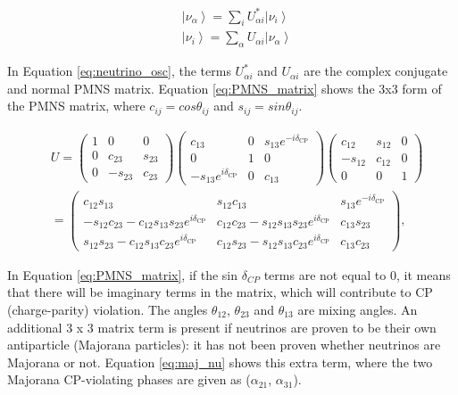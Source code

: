 $$
\begin{aligned}
&\left|\nu_{\alpha}\right\rangle=\sum_{i} U_{\alpha i}^{*}\left|\nu_{i}\right\rangle \\
&\left|\nu_{i}\right\rangle=\sum_{\alpha} U_{\alpha i}\left|\nu_{\alpha}\right\rangle
\end{aligned}
\label{eq:neutrino_osc}
$$


In Equation \ref{eq:neutrino_osc}, the terms $U_{\alpha i}^{*}$ and $U_{\alpha i}$ are the complex conjugate and normal PMNS matrix. Equation \ref{eq:PMNS_matrix} shows the 3x3 form of the PMNS matrix, where $c_{ij} = cos {\theta_{ij}}$ and $s_{ij} = sin {\theta_{ij}}$.

$$
\begin{aligned}
&U=\left(\begin{array}{ccc}
1 & 0 & 0 \\
0 & c_{23} & s_{23} \\
0 & -s_{23} & c_{23}
\end{array}\right)\left(\begin{array}{ccc}
c_{13} & 0 & s_{13} e^{-i \delta_{\mathrm{CP}}} \\
0 & 1 & 0 \\
-s_{13} e^{i \delta_{\mathrm{CP}}} & 0 & c_{13}
\end{array}\right)\left(\begin{array}{ccc}
c_{12} & s_{12} & 0 \\
-s_{12} & c_{12} & 0 \\
0 & 0 & 1
\end{array}\right)\\
&=\left(\begin{array}{ccc}
c_{12} s_{13} & s_{12} c_{13} & s_{13} e^{-i \delta_{\mathrm{CP}}} \\
-s_{12} c_{23}-c_{12} s_{13} s_{23} e^{i \delta_{\mathrm{CP}}} & c_{12} c_{23}-s_{12} s_{13} s_{23} e^{i \delta_{\mathrm{CP}}} & c_{13} s_{23} \\
s_{12} s_{23}-c_{12} s_{13} c_{23} e^{i \delta_{\mathrm{CP}}} & c_{12} s_{23}-s_{12} s_{13} c_{23} e^{i \delta_{\mathrm{CP}}} & c_{13} c_{23}
\end{array}\right),
\end{aligned}
\label{eq:PMNS_matrix}
$$

In Equation \ref{eq:PMNS_matrix}, if the sin $\delta_{CP}$ terms are not equal to 0, it means that there will be imaginary terms in the matrix, which will contribute to CP (charge-parity) violation. The angles $\theta_{12}$, $\theta_{23}$ and $\theta_{13}$ are mixing angles. An additional 3 x 3 matrix term is present if neutrinos are proven to be their own antiparticle (Majorana particles): it has not been proven whether neutrinos are Majorana or not. Equation \ref{eq:maj_nu} shows this extra term, where the two Majorana CP-violating phases are given as ($\alpha_{21}$, $\alpha_{31}$). 

